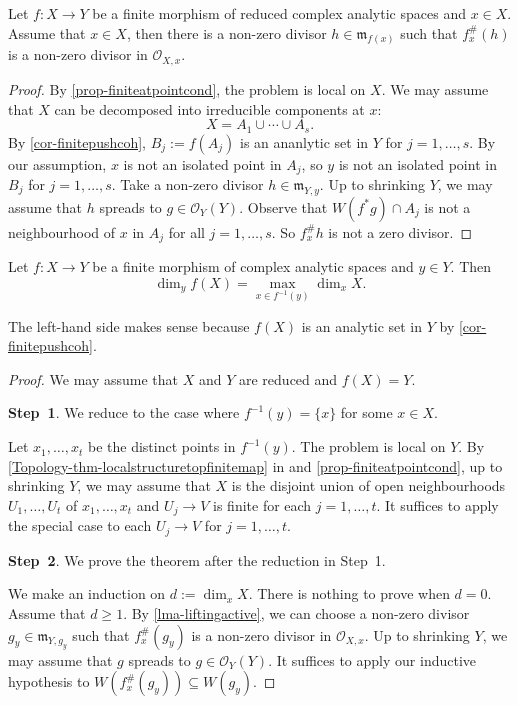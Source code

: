 \begin{lemma}\label{lma-liftingactive}
    Let $f:X\rightarrow Y$ be a finite morphism of reduced complex analytic spaces and $x\in X$. Assume that $x\in X$, then there is a non-zero divisor $h\in \mathfrak{m}_{f(x)}$ such that $f^{\#}_x(h)$ is a non-zero divisor in $\mathcal{O}_{X,x}$.
\end{lemma}
\begin{proof}
    By \cref{prop-finiteatpointcond}, the problem is local on $X$. We may assume that $X$ can be decomposed into irreducible components at $x$:
    \[
        X=A_1\cup \cdots\cup A_s.    
    \] 
    By \cref{cor-finitepushcoh}, $B_j:=f(A_j)$ is an ananlytic set in $Y$ for $j=1,\ldots,s$. By our assumption, $x$ is not an isolated point in $A_j$, so $y$ is not an isolated point in $B_j$ for $j=1,\ldots,s$. Take a non-zero divisor $h\in \mathfrak{m}_{Y,y}$. Up to shrinking $Y$, we may assume that $h$ spreads to $g\in \mathcal{O}_Y(Y)$. Observe that $W(f^*g)\cap A_j$ is not a neighbourhood of $x$ in $A_j$ for all $j=1,\ldots,s$. So $f^{\#}_xh$ is not a zero divisor.
\end{proof}

\begin{thm}\label{thm-finitemapdim}
    Let $f:X\rightarrow Y$ be a finite morphism of complex analytic spaces and $y\in Y$. Then
    \[
        \dim_y f(X)=\max_{x\in f^{-1}(y)}\dim_x X.  
    \]
\end{thm}
The left-hand side makes sense because $f(X)$ is an analytic set in $Y$ by \cref{cor-finitepushcoh}.
\begin{proof}
    We may assume that $X$ and $Y$ are reduced and $f(X)=Y$.

    \textbf{Step~1}. We reduce to the case where $f^{-1}(y)=\{x\}$ for some $x\in X$.

    Let $x_1,\ldots,x_t$ be the distinct points in $f^{-1}(y)$. The problem is local on $Y$.
    By \cref{Topology-thm-localstructuretopfinitemap} in  and \cref{prop-finiteatpointcond}, up to shrinking $Y$, we may assume that $X$ is the disjoint union of open neighbourhoods $U_1,\ldots,U_t$ of $x_1,\ldots,x_t$ and $U_j\rightarrow V$ is finite for each $j=1,\ldots,t$. It suffices to apply the special case to each $U_j\rightarrow V$ for $j=1,\ldots,t$.

    \textbf{Step~2}. We prove the theorem after the reduction in Step~1.

    We make an induction on $d:=\dim_x X$. There is nothing to prove when $d=0$. Assume that $d\geq 1$. By \cref{lma-liftingactive}, we can choose a non-zero divisor $g_y\in \mathfrak{m}_{Y,g_y}$ such that $f^{\#}_x(g_y)$ is a non-zero divisor in $\mathcal{O}_{X,x}$. Up to shrinking $Y$, we may assume that $g$ spreads to $g\in \mathcal{O}_Y(Y)$. It suffices to apply our inductive hypothesis to $W(f^{\#}_x(g_y))\subseteq W(g_y)$.
\end{proof}

